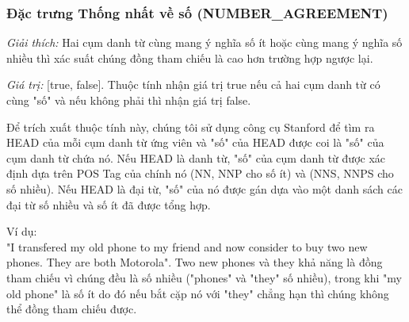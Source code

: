 \documentclass[12pt]{report}
\begin{document}
				\subsubsection*{Đặc trưng Thống nhất về số (NUMBER\_AGREEMENT)}
					\par \textit{Giải thích:} Hai cụm danh từ cùng mang ý nghĩa số ít hoặc cùng mang ý nghĩa số nhiều thì xác suất chúng đồng tham chiếu là cao hơn trường hợp ngược lại. 
					\par \textit{Giá trị:} [true, false]. Thuộc tính nhận giá trị true nếu cả hai cụm danh từ có cùng "số" và nếu không phải thì nhận giá trị false.
					\par Để trích xuất thuộc tính này, chúng tôi sử dụng công cụ Stanford để tìm ra HEAD của mỗi cụm danh từ ứng viên và "số" của HEAD được coi là "số" của cụm danh từ chứa nó. Nếu HEAD là danh từ, "số" của cụm danh từ được xác định dựa trên POS Tag của chính nó (NN, NNP cho số ít) và (NNS, NNPS cho số nhiều). Nếu HEAD là đại từ, "số" của nó được gán dựa vào một danh sách các đại từ số nhiều và số ít đã được tổng hợp.
					\par Ví dụ:
					\\"I transfered my old phone to my friend and now consider to buy two new phones. They are both Motorola". Two new phones và they khả năng là đồng tham chiếu vì chúng đều là số nhiều ("phones" và "they" số nhiều), trong khi "my old phone" là số ít do đó nếu bắt cặp nó với "they" chẳng hạn thì chúng không thể đồng tham chiếu được.				
\end{document}
